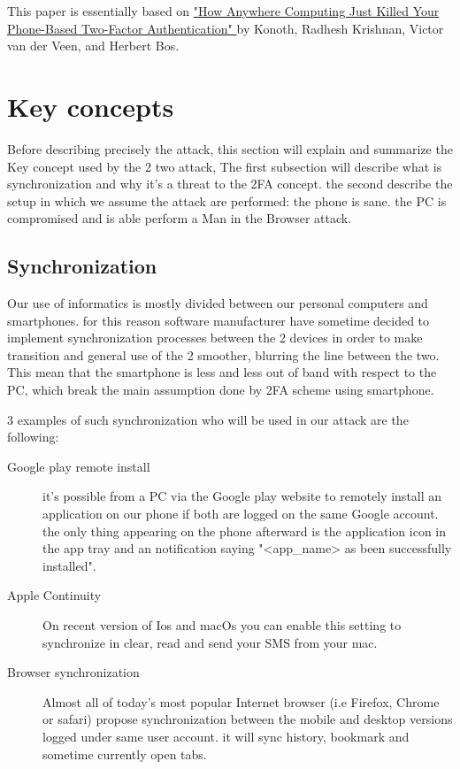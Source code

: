 \documentclass[11pt, a4paper,twocolumn]{article}
\begin{document}
This paper is essentially based on \href{http://fc16.ifca.ai/preproceedings/24_Konoth.pdf}{"How Anywhere Computing Just Killed Your Phone-Based Two-Factor Authentication" } by  Konoth, Radhesh Krishnan, Victor van der Veen, and Herbert Bos.

\section{Key concepts}
Before describing precisely the attack, this section will explain and summarize the Key concept used by the 2 two attack,  The first subsection will describe what is synchronization and why it's a threat to the 2FA concept. the second describe the setup in which we assume the attack are performed: the phone is sane. the PC is compromised and is able perform a Man in the Browser attack.
\subsection{Synchronization}
Our use of informatics is mostly divided between our personal computers 
and smartphones. for this reason software manufacturer have sometime decided to implement synchronization processes between the 2 devices in order to make transition and general use of the 2 smoother, blurring the line between the two. This mean that the smartphone is less and less out of band with respect to the PC, which break the main assumption done by 2FA scheme using smartphone.

3 examples of such synchronization who will be used in our attack are the 
following:
\begin{description}
  \item[Google play remote install] it's possible from a PC via the Google play website to remotely install an application on our phone if both are logged on the same Google account. the only thing appearing on the phone afterward is the application icon in the app tray and an notification saying "<app\_name> as been successfully installed".
  
  \item[Apple Continuity] On recent version of Ios and macOs you can enable this setting to synchronize in clear, read and send your SMS from your mac.
  
  \item[Browser synchronization] Almost all of today's most popular Internet browser (i.e Firefox, Chrome or safari) propose synchronization between the mobile and desktop versions logged under same user account. it will sync history, bookmark and sometime currently open tabs.
\end{description}
\end{document}

